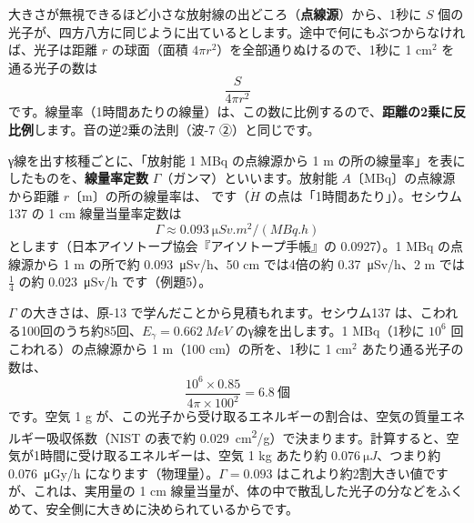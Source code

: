 \label{ph:原-14:sec6}
\noindent\begin{minipage}[c]{0.55\linewidth}\raggedright
大きさが無視できるほど小さな放射線の出どころ（\textbf{点線源}）から、1秒に $S$ 個の光子が、四方八方に同じように出ているとします。途中で何にもぶつからなければ、光子は距離 $r$ の球面（面積 $4\pi r^2$）を全部通りぬけるので、1秒に 1 cm$^2$ を通る光子の数は
\[ \frac{S}{4\pi r^2} \]
です。線量率（1時間あたりの線量）は、この数に比例するので、\textbf{距離の2乗に反比例}します。音の逆2乗の法則（波-7 ②）と同じです。
\end{minipage}\hfill
\begin{minipage}[c]{0.42\linewidth}\centering
{}
\end{minipage}

γ線を出す核種ごとに、「放射能 1 MBq の点線源から 1 m の所の線量率」を表にしたものを、\textbf{線量率定数} $\Gamma$（ガンマ）といいます。放射能 $A$〔MBq〕の点線源から距離 $r$〔m〕の所の線量率は、
\label{ph:原-14:gyaku2}です（$\dot H$ の点は「1時間あたり」）。セシウム137 の 1 cm 線量当量率定数は
\[ \Gamma\approx\qty{0.093}{\micro Sv.m^2/(MBq.h)} \]
とします（日本アイソトープ協会『アイソトープ手帳』の 0.0927）。1 MBq の点線源から 1 m の所で約 \qty{0.093}{\micro Sv/h}、50 cm では4倍の約 \qty{0.37}{\micro Sv/h}、2 m では $\tfrac14$ の約 \qty{0.023}{\micro Sv/h} です（例題5）。

$\Gamma$ の大きさは、原-13 で学んだことから見積もれます。セシウム137 は、こわれる100回のうち約85回、$E_\gamma=\qty{0.662}{MeV}$ のγ線を出します。1 MBq（1秒に $10^6$ 回こわれる）の点線源から 1 m（100 cm）の所を、1秒に 1 cm$^2$ あたり通る光子の数は、
\[ \frac{10^6\times0.85}{4\pi\times100^2}=6.8\ \text{個} \]
です。空気 1 g が、この光子から受け取るエネルギーの割合は、空気の質量エネルギー吸収係数（NIST の表で約 \qty{0.029}{cm^2/g}）で決まります。計算すると、空気が1時間に受け取るエネルギーは、空気 1 kg あたり約 $\qty{0.076}{\micro J}$、つまり約 \qty{0.076}{\micro Gy/h} になります（物理量）。$\Gamma=0.093$ はこれより約2割大きい値ですが、これは、実用量の 1 cm 線量当量が、体の中で散乱した光子の分などをふくめて、安全側に大きめに決められているからです。

